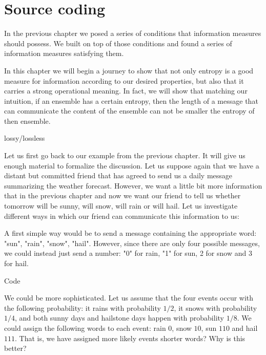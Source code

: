 \chapter{Source coding}
In the previous chapter we posed a series of conditions that information measures should possess. We built on top of those conditions and found a series of information measures satisfying them. 

In this chapter we will begin a journey to show that not only entropy is a good measure for information according to our desired properties, but also that it carries a strong operational meaning. In fact, we will show that matching  our intuition, if an ensemble has a certain entropy, then the length of a message that can communicate the content of the ensemble can not be smaller the entropy of then ensemble. 


lossy/lossless

Let us first go back to our example from the previous chapter. It will give us enough material to formalize the discussion. Let us suppose again that we have a distant but committed friend that has agreed to send us a daily message summarizing the weather forecast. However, we want a little bit more information that in the previous chapter and now we want our friend to tell us whether tomorrow will be sunny, will snow, will rain or will hail. Let us investigate different ways in which our friend can communicate this information to us:

A first simple way would be to send a message containing the appropriate word: "sun", "rain", "snow", "hail". However, since there are only four possible messages, we could instead just send a number: "0" for rain, "1" for sun, 2 for snow and 3 for hail. 

\begin{definition}
Code
\end{definition}
We could be more sophisticated. Let us assume that the four events occur with the following probability: it rains with probability $1/2$, it snows with probability $1/4$, and both sunny days and hailstone days happen with probability $1/8$. We could assign the following words to each event: rain $0$, snow $10$, sun $110$ and hail $111$. That is, we have assigned more likely events shorter words? Why is this better?

